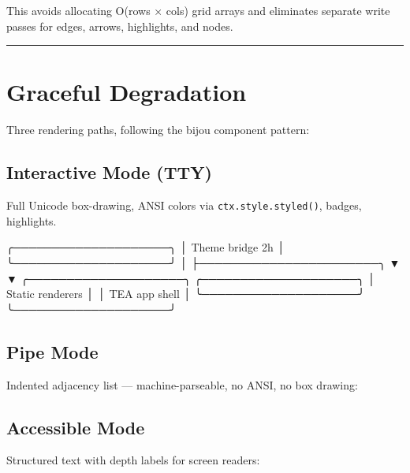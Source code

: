 This avoids allocating O(rows × cols) grid arrays and eliminates separate write passes for edges, arrows, highlights, and nodes.

\begin{center}\rule{0.5\linewidth}{0.5pt}\end{center}

\section{Graceful Degradation}\label{record-426-graceful-degradation}

Three rendering paths, following the bijou component pattern:

\subsection{Interactive Mode (TTY)}\label{record-426-interactive-mode-tty}

Full Unicode box-drawing, ANSI colors via \texttt{c\allowbreak{}t\allowbreak{}x\allowbreak{}.\allowbreak{}s\allowbreak{}t\allowbreak{}y\allowbreak{}l\allowbreak{}e\allowbreak{}.\allowbreak{}s\allowbreak{}t\allowbreak{}y\allowbreak{}l\allowbreak{}e\allowbreak{}d\allowbreak{}(\allowbreak{})}, badges, highlights.

\begin{CodeBlock}
╭────────────────────╮
│ Theme bridge    2h │
╰────────────────────╯
          │
          ├───────────────────────╮
          ▼                       ▼
╭────────────────────╮  ╭────────────────────╮
│ Static renderers   │  │ TEA app shell      │
╰────────────────────╯  ╰────────────────────╯
\end{CodeBlock}

\subsection{Pipe Mode}\label{record-426-pipe-mode}

Indented adjacency list --- machine-parseable, no ANSI, no box drawing:



\subsection{Accessible Mode}\label{record-426-accessible-mode}

Structured text with depth labels for screen readers:



